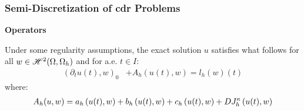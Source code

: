 \begin{frame}
    \frametitle{Semi-Discretization of \acrshort{cdr} Problems}

    \vspace*{\fill}
    \begin{center}
        {\color{\accentcolor} \Large \textbf{Operators}}
        \vspace*{0.25cm}

        \begin{minipage}{0.75\textwidth}
            \begin{definition}
                Under some regularity assumptions, the exact solution $u$ satisfies what follows for all $w \in \mathscr{H}^{2}(\Omega, \Omega_h)$ and for a.e. $t \in I$:
                \begin{align*}
                    \left( \partial_t u(t), w \right)_0 &+ A_h(u(t), w) = l_h \left( w \right) (t)
                \end{align*}
                where:
                \begin{align*}
                    A_h(u, w) = a_h \left( u(t), w \right) + b_h \left( u(t), w \right) + c_h \left( u(t), w \right) + D J^{\kappa}_h \left( u(t), w \right)
                \end{align*}
            \end{definition}
        \end{minipage}
    \end{center}
    \vspace*{\fill}
    
\end{frame}

